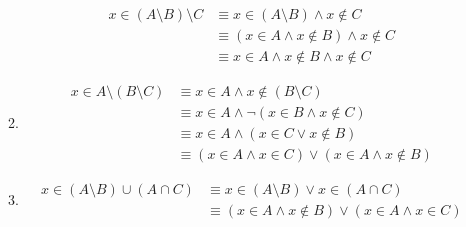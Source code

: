 \documentclass{article}
\begin{document}
\begin{enumerate}
\begin{enumerate}
\begin{equation*}
\begin{aligned}
    x \in (A \setminus B) \setminus C &\equiv x \in (A \setminus B) \land x \notin C \\
    &\equiv (x \in A \land x \notin B) \land x \notin C \\
    &\equiv x \in A \land x \notin B \land x \notin C
      \end{aligned}
    \end{equation*}
  \item
    \begin{equation*}
      \begin{aligned}
        x \in A \setminus (B \setminus C) &\equiv x \in A \land x \notin (B \setminus C) \\
        &\equiv x \in A \land \lnot (x \in B \land x \notin C) \\
        &\equiv x \in A \land (x \in C \lor x \notin B) \\
        &\equiv (x \in A \land x \in C) \lor (x \in A \land x \notin B)
        \end{aligned}
    \end{equation*}
  \item
    \begin{equation*}
      \begin{aligned}
        x \in (A \setminus B) \cup (A \cap C) &\equiv x \in (A \setminus B) \lor x \in (A \cap C) \\
        &\equiv (x \in A \land x \notin B) \lor (x \in A \land x \in C)
        \end{aligned}
      \end{equation*}


\end{enumerate}
\end{enumerate}
\end{document}
